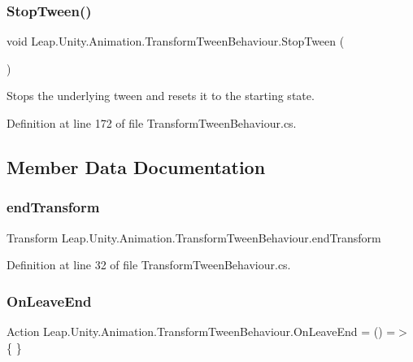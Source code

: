 \subsubsection{\texorpdfstring{StopTween()}{StopTween()}}
{\footnotesize\ttfamily void Leap.\+Unity.\+Animation.\+Transform\+Tween\+Behaviour.\+Stop\+Tween (\begin{DoxyParamCaption}{ }\end{DoxyParamCaption})}



Stops the underlying tween and resets it to the starting state. 



Definition at line 172 of file Transform\+Tween\+Behaviour.\+cs.



\subsection{Member Data Documentation}
\mbox{\label{class_leap_1_1_unity_1_1_animation_1_1_transform_tween_behaviour_a9d4e2b6c1c49f7e19b792b05e91a6477}} 
\subsubsection{\texorpdfstring{endTransform}{endTransform}}
{\footnotesize\ttfamily Transform Leap.\+Unity.\+Animation.\+Transform\+Tween\+Behaviour.\+end\+Transform}



Definition at line 32 of file Transform\+Tween\+Behaviour.\+cs.

\mbox{\label{class_leap_1_1_unity_1_1_animation_1_1_transform_tween_behaviour_ab20f68f70b439fc640b98244729b0069}} 
\subsubsection{\texorpdfstring{OnLeaveEnd}{OnLeaveEnd}}
{\footnotesize\ttfamily Action Leap.\+Unity.\+Animation.\+Transform\+Tween\+Behaviour.\+On\+Leave\+End = () =$>$ \{ \}}



